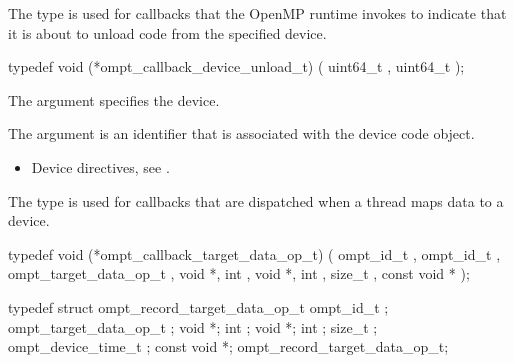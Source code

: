 \label{sec:ompt_callback_device_unload_t}

\summary
The  type is used for callbacks that 
the OpenMP runtime invokes to indicate that it is about to unload code from
the specified device.

\format
\begin{ccppspecific}
\begin{omptCallback}
typedef void (*ompt_callback_device_unload_t) (
  uint64_t ,
  uint64_t 
);
\end{omptCallback}
\end{ccppspecific}

\argdesc
The  argument specifies the device.

The  argument is an identifier that is associated 
with the device code object.

\crossreferences
\begin{itemize}
\item Device directives, see .
\end{itemize}



\label{sec:ompt_callback_target_data_op_t}
\summary
The  type is used for callbacks that are
dispatched when a thread maps data to a device.

\format
\begin{ccppspecific}
\begin{omptCallback}
typedef void (*ompt_callback_target_data_op_t) (
  ompt_id_t ,
  ompt_id_t ,
  ompt_target_data_op_t ,
  void *,
  int ,
  void *,
  int ,
  size_t ,
  const void *
);
\end{omptCallback}
\end{ccppspecific}

\record
\begin{ccppspecific}
\begin{omptRecord}
typedef struct ompt_record_target_data_op_t {
  ompt_id_t ;
  ompt_target_data_op_t ;
  void *;
  int ;
  void *;
  int ;
  size_t ;
  ompt_device_time_t ;
  const void *;
} ompt_record_target_data_op_t;
\end{omptRecord}
\end{ccppspecific}

